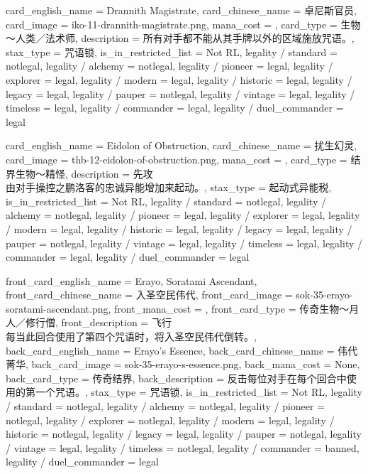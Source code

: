 \documentclass[lang = cn, color = black, 10pt]{AllThatStax}
\begin{document}
\card
{
	card_english_name = {Drannith Magistrate},
	card_chinese_name = {卓尼斯官员},
	card_image = iko-11-drannith-magistrate.png,
	mana_cost = ,
	card_type = 生物～人类／法术师,
	description = {所有对手都不能从其手牌以外的区域施放咒语。},
	stax_type = 咒语锁,
	is_in_restricted_list = Not RL,
	legality / standard = notlegal,
	legality / alchemy = notlegal,
	legality / pioneer = legal,
	legality / explorer = legal,
	legality / modern = legal,
	legality / historic = legal,
	legality / legacy = legal,
	legality / pauper = notlegal,
	legality / vintage = legal,
	legality / timeless = legal,
	legality / commander = legal,
	legality / duel_commander = legal
}

\card
{
	card_english_name = {Eidolon of Obstruction},
	card_chinese_name = {扰生幻灵},
	card_image = thb-12-eidolon-of-obstruction.png,
	mana_cost = ,
	card_type = 结界生物～精怪,
	description = {先攻\\
由对手操控之鹏洛客的忠诚异能增加来起动。},
	stax_type = 起动式异能税,
	is_in_restricted_list = Not RL,
	legality / standard = notlegal,
	legality / alchemy = notlegal,
	legality / pioneer = legal,
	legality / explorer = legal,
	legality / modern = legal,
	legality / historic = legal,
	legality / legacy = legal,
	legality / pauper = notlegal,
	legality / vintage = legal,
	legality / timeless = legal,
	legality / commander = legal,
	legality / duel_commander = legal
}

\mfcard
{
	front_card_english_name = {Erayo, Soratami Ascendant},
	front_card_chinese_name = {入圣空民伟代},
	front_card_image = sok-35-erayo-soratami-ascendant.png,
	front_mana_cost = ,
	front_card_type = 传奇生物～月人／修行僧,
	front_description = {飞行\\
每当此回合使用了第四个咒语时，将入圣空民伟代倒转。},
	back_card_english_name = {Erayo's Essence},
	back_card_chinese_name = {伟代菁华},
	back_card_image = sok-35-erayo-s-essence.png,
	back_mana_cost = None,
	back_card_type = 传奇结界,
	back_description = {反击每位对手在每个回合中使用的第一个咒语。},
	stax_type = 咒语锁,
	is_in_restricted_list = Not RL,
	legality / standard = notlegal,
	legality / alchemy = notlegal,
	legality / pioneer = notlegal,
	legality / explorer = notlegal,
	legality / modern = legal,
	legality / historic = notlegal,
	legality / legacy = legal,
	legality / pauper = notlegal,
	legality / vintage = legal,
	legality / timeless = notlegal,
	legality / commander = banned,
	legality / duel_commander = legal
}
\end{document}
